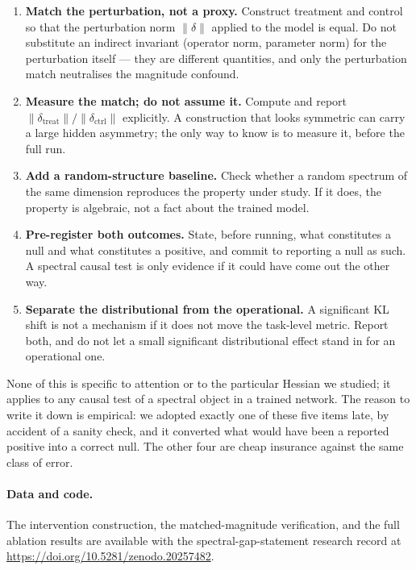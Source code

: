 \documentclass[11pt]{article}
\begin{document}
\begin{enumerate}
  \item \textbf{Match the perturbation, not a proxy.} Construct treatment
    and control so that the perturbation norm $\|\delta\|$ applied to the
    model is equal. Do not substitute an indirect invariant (operator
    norm, parameter norm) for the perturbation itself --- they are
    different quantities, and only the perturbation match neutralises the
    magnitude confound.
  \item \textbf{Measure the match; do not assume it.} Compute and report
    $\|\delta_{\mathrm{treat}}\|/\|\delta_{\mathrm{ctrl}}\|$ explicitly. A
    construction that looks symmetric can carry a large hidden asymmetry;
    the only way to know is to measure it, before the full run.
  \item \textbf{Add a random-structure baseline.} Check whether a random
    spectrum of the same dimension reproduces the property under study. If
    it does, the property is algebraic, not a fact about the trained
    model.
  \item \textbf{Pre-register both outcomes.} State, before running, what
    constitutes a null and what constitutes a positive, and commit to
    reporting a null as such. A spectral causal test is only evidence if
    it could have come out the other way.
  \item \textbf{Separate the distributional from the operational.} A
    significant KL shift is not a mechanism if it does not move the
    task-level metric. Report both, and do not let a small significant
    distributional effect stand in for an operational one.
\end{enumerate}

\noindent
None of this is specific to attention or to the particular Hessian we
studied; it applies to any causal test of a spectral object in a trained
network. The reason to write it down is empirical: we adopted exactly one
of these five items late, by accident of a sanity check, and it converted
what would have been a reported positive into a correct null. The other
four are cheap insurance against the same class of error.

\paragraph{Data and code.}
The intervention construction, the matched-magnitude verification, and the
full ablation results are available with the spectral-gap-statement
research record at \url{https://doi.org/10.5281/zenodo.20257482}.
\end{document}
